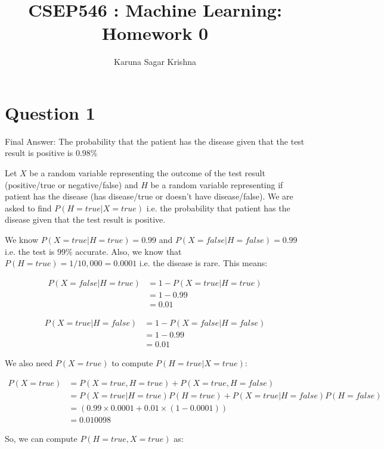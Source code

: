 \documentclass{article}
\title{CSEP546 : Machine Learning: Homework 0}
\author{Karuna Sagar Krishna}
\begin{document}
    \maketitle

    \section*{Question 1}
    Final Answer: The probability that the patient has the disease given that the test result is positive is $0.98\%$

    Let $X$ be a random variable representing the outcome of the test result (positive/true or negative/false) and $H$ be a random variable representing if patient has the disease (has disease/true or doesn't have disease/false). We are asked to find $P(H=true | X=true)$ i.e. the probability that patient has the disease given that the test result is positive.

    We know $P(X=true | H=true) = 0.99$ and $P(X=false | H=false) = 0.99$ i.e. the test is $99\%$ accurate. Also, we know that $P(H=true) = 1 / 10,000 = 0.0001$ i.e. the disease is rare. This means:

    \begin{align*}
        P(X=false | H=true) &= 1 - P(X=true | H=true) \\
                            &= 1 - 0.99 \\
                            &= 0.01
    \end{align*}

    \begin{align*}
        P(X=true | H=false) &= 1 - P(X=false | H=false) \\
                            &= 1 - 0.99 \\
                            &= 0.01
    \end{align*}

    We also need $P(X=true)$ to compute $P(H=true | X=true)$:
    
    \begin{align*}
        P(X=true)   &= P(X=true, H=true) + P(X=true, H=false) \\
                    &= P(X=true | H=true) P(H=true) + P(X=true | H=false) P(H=false) \\
                    &= (0.99 \times 0.0001 + 0.01 \times (1-0.0001)) \\
                    &= 0.010098
    \end{align*}

    So, we can compute $P(H=true, X=true)$ as:
\end{document}

